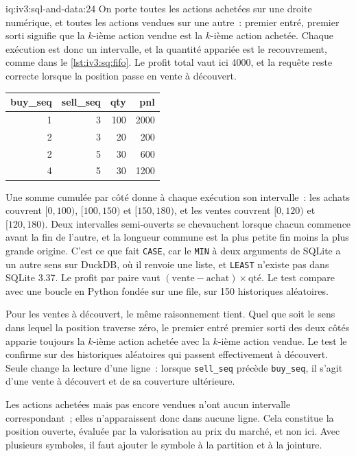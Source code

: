 \begin{solution}{iq:iv3:sql-and-data:24}
On porte toutes les actions achetées sur une droite numérique, et toutes les actions vendues sur une autre~: premier entré, premier sorti signifie que la $k$-ième action vendue est la $k$-ième action achetée. Chaque exécution est donc un intervalle, et la quantité appariée est le recouvrement, comme dans le \cref{lst:iv3:sq:fifo}. Le profit total vaut ici 4000, et la requête reste correcte lorsque la position passe en vente à découvert.
\label{lst:iv3:sq:fifo}
\begin{center}\small
\begin{tabular}{rrrr}
buy\_seq & sell\_seq & qty & pnl\\\hline
1 & 3 & 100 & 2000\\
2 & 3 & 20 & 200\\
2 & 5 & 30 & 600\\
4 & 5 & 30 & 1200
\end{tabular}
\end{center}
Une somme cumulée par côté donne à chaque exécution son intervalle~: les achats couvrent $[0, 100)$, $[100, 150)$ et $[150, 180)$, et les ventes couvrent $[0, 120)$ et $[120, 180)$. Deux intervalles semi-ouverts se chevauchent lorsque chacun commence avant la fin de l'autre, et la longueur commune est la plus petite fin moins la plus grande origine. C'est ce que fait \texttt{CASE}, car le \texttt{MIN} à deux arguments de SQLite a un autre sens sur DuckDB, où il renvoie une liste, et \texttt{LEAST} n'existe pas dans SQLite 3.37. Le profit par paire vaut $(\text{vente} - \text{achat}) \times \text{qté}$. Le test compare avec une boucle en Python fondée sur une file, sur 150 historiques aléatoires.

Pour les ventes à découvert, le même raisonnement tient. Quel que soit le sens dans lequel la position traverse zéro, le premier entré premier sorti des deux côtés apparie toujours la $k$-ième action achetée avec la $k$-ième action vendue. Le test le confirme sur des historiques aléatoires qui passent effectivement à découvert. Seule change la lecture d'une ligne~: lorsque \texttt{sell\_seq} précède \texttt{buy\_seq}, il s'agit d'une vente à découvert et de sa couverture ultérieure.

Les actions achetées mais pas encore vendues n'ont aucun intervalle correspondant~; elles n'apparaissent donc dans aucune ligne. Cela constitue la position ouverte, évaluée par la valorisation au prix du marché, et non ici. Avec plusieurs symboles, il faut ajouter le symbole à la partition et à la jointure.


\end{solution}
